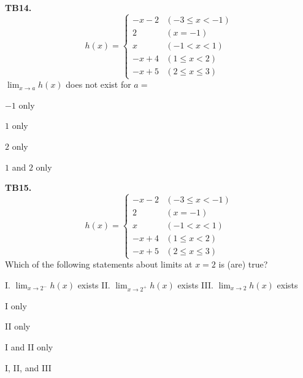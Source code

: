 \documentclass[11pt]{article}
\begin{document}
\bigskip\noindent\textbf{TB14.}\ \[
h(x) = \begin{cases}
-x-2 & (-3 \leq x < -1) \\
2 & (x = -1) \\
x & (-1 < x < 1) \\
-x+4 & (1 \leq x < 2) \\
-x+5 & (2 \leq x \leq 3)
\end{cases}
\]
$\displaystyle\lim_{x\to a} h(x)$ does not exist for $a =$
\begin{list}{}{\setlength{\leftmargin}{3em}\setlength{\labelwidth}{2.5em}\setlength{\itemsep}{0pt}\setlength{\topsep}{2pt}}
\item[(A)] $-1$ only
\item[(B)] $1$ only
\item[(C)] $2$ only
\item[(D)] $1$ and $2$ only
\end{list}

\bigskip\noindent\textbf{TB15.}\ \[
h(x) = \begin{cases}
-x-2 & (-3 \leq x < -1) \\
2 & (x = -1) \\
x & (-1 < x < 1) \\
-x+4 & (1 \leq x < 2) \\
-x+5 & (2 \leq x \leq 3)
\end{cases}
\]
Which of the following statements about limits at $x = 2$ is (are) true?

I. $\displaystyle\lim_{x\to 2^-} h(x)$ exists
II. $\displaystyle\lim_{x\to 2^+} h(x)$ exists
III. $\displaystyle\lim_{x\to 2} h(x)$ exists
\begin{list}{}{\setlength{\leftmargin}{3em}\setlength{\labelwidth}{2.5em}\setlength{\itemsep}{0pt}\setlength{\topsep}{2pt}}
\item[(A)] I only
\item[(B)] II only
\item[(C)] I and II only
\item[(D)] I, II, and III
\end{list}
\end{document}
